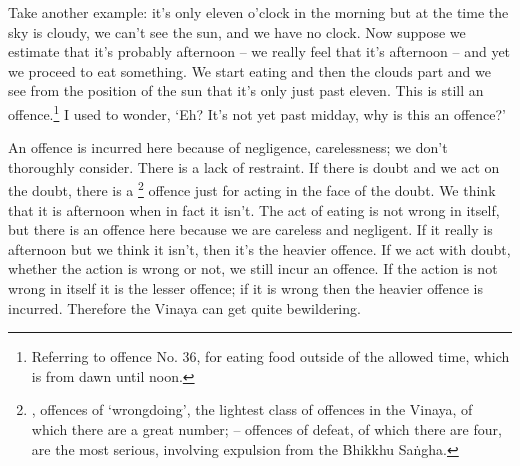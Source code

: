 Take another example: it's only eleven o'clock in the morning but at the time the sky is cloudy, we can't see the sun, and we have no clock. Now suppose we estimate that it's probably afternoon -- we really feel that it's afternoon -- and yet we proceed to eat something. We start eating and then the clouds part and we see from the position of the sun that it's only just past eleven. This is still an offence.\footnote{Referring to  offence No. 36, for eating food outside of the allowed time, which is from dawn until noon.} I used to wonder, `Eh? It's not yet past midday, why is this an offence?' 

An offence is incurred here because of negligence, carelessness; we don't thoroughly consider. There is a lack of restraint. If there is doubt and we act on the doubt, there is a \footnote{, offences of `wrongdoing', the lightest class of offences in the Vinaya, of which there are a great number;  -- offences of defeat, of which there are four, are the most serious, involving expulsion from the Bhikkhu Sa\.ngha. } offence just for acting in the face of the doubt. We think that it is afternoon when in fact it isn't. The act of eating is not wrong in itself, but there is an offence here because we are careless and negligent. If it really is afternoon but we think it isn't, then it's the heavier  offence. If we act with doubt, whether the action is wrong or not, we still incur an offence. If the action is not wrong in itself it is the lesser offence; if it is wrong then the heavier offence is incurred. Therefore the Vinaya can get quite bewildering. 

